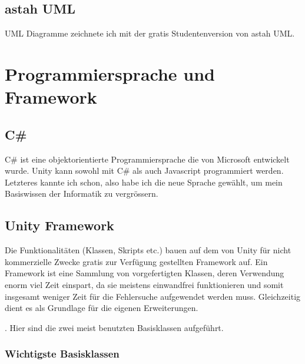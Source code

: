 \subsection{astah UML}

UML Diagramme zeichnete ich mit der gratis Studentenversion von astah UML.

\section{Programmiersprache und Framework}

\subsection{C\#}
C\# ist eine objektorientierte Programmiersprache die von Microsoft entwickelt wurde.
Unity kann sowohl mit C\# als auch Javascript programmiert werden.
Letzteres kannte ich schon, also habe ich die neue Sprache gewählt, um mein Basiswissen der Informatik zu vergrössern.

\subsection{Unity Framework}
Die Funktionalitäten (Klassen, Skripts etc.) bauen auf dem von Unity für nicht kommerzielle Zwecke gratis zur Verfügung gestellten Framework auf.
Ein Framework ist eine Sammlung von vorgefertigten Klassen, deren Verwendung enorm viel Zeit einspart, da sie meistens einwandfrei funktionieren und somit insgesamt weniger Zeit für die Fehlersuche aufgewendet werden muss. Gleichzeitig dient es als Grundlage für die eigenen Erweiterungen.

.
Hier sind die zwei meist benutzten Basisklassen aufgeführt.

\subsubsection{Wichtigste Basisklassen}

